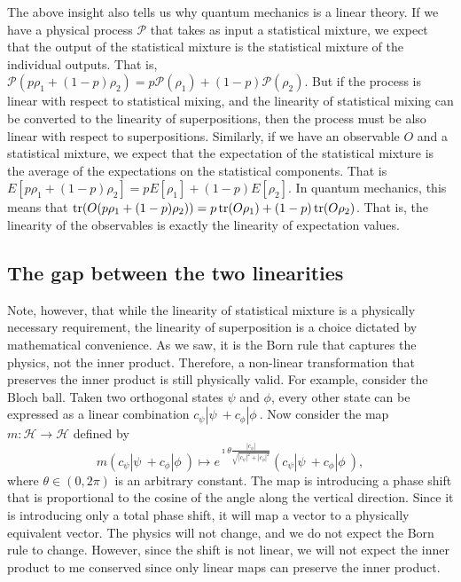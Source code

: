 The above insight also tells us why quantum mechanics is a linear theory. If we have a physical process $\mathcal{P}$ that takes as input a statistical mixture, we expect that the output of the statistical mixture is the statistical mixture of the individual outputs. That is, $\mathcal{P}(p\rho_1 + (1-p) \rho_2) = p \mathcal{P}(\rho_1) + (1-p) \mathcal{P}(\rho_2)$. But if the process is linear with respect to statistical mixing, and the linearity of statistical mixing can be converted to the linearity of superpositions, then the process must be also linear with respect to superpositions. Similarly, if we have an observable $O$ and a statistical mixture, we expect that the expectation of the statistical mixture is the average of the expectations on the statistical components. That is $E[p\rho_1 + (1-p) \rho_2] = pE[\rho_1] + (1-p) E[\rho_2]$. In quantum mechanics, this means that $\operatorname{tr}(O(p\rho_1 + (1-p) \rho_2)) = p\operatorname{tr}(O\rho_1) + (1-p) \operatorname{tr}(O\rho_2)$. That is, the linearity of the observables is exactly the linearity of expectation values.

\subsection{The gap between the two linearities}

Note, however, that while the linearity of statistical mixture is a physically necessary requirement, the linearity of superposition is a choice dictated by mathematical convenience. As we saw, it is the Born rule that captures the physics, not the inner product. Therefore, a non-linear transformation that preserves the inner product is still physically valid. For example, consider the Bloch ball. Taken two orthogonal states $\psi$ and $\phi$, every other state can be expressed as a linear combination $c_{\psi} | \psi \> + c_{\phi} | \phi \>$. Now consider the map $m : \mathcal{H} \to \mathcal{H}$ defined by
\begin{equation}
	m(c_{\psi} | \psi \> + c_{\phi} | \phi \>) \mapsto e^{\imath \theta \frac{|c_{\phi}|}{\sqrt{|c_{\psi}|^2+|c_{\phi}|^2}}} ( c_{\psi} | \psi \> + c_{\phi}  | \phi \>),
\end{equation}
where $\theta \in (0,2\pi)$ is an arbitrary constant. The map is introducing a phase shift that is proportional to the cosine of the angle along the vertical direction. Since it is introducing only a total phase shift, it will map a vector to a physically equivalent vector. The physics will not change, and we do not expect the Born rule to change. However, since the shift is not linear, we will not expect the inner product to me conserved since only linear maps can preserve the inner product.

